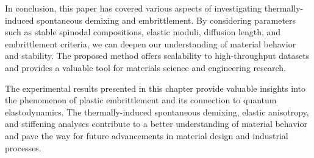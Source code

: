 In conclusion, this paper has covered various aspects of investigating thermally-induced spontaneous demixing and embrittlement. By considering parameters such as stable spinodal compositions, elastic moduli, diffusion length, and embrittlement criteria, we can deepen our understanding of material behavior and stability. The proposed method offers scalability to high-throughput datasets and provides a valuable tool for materials science and engineering research.

The experimental results presented in this chapter provide valuable insights into the phenomenon of plastic embrittlement and its connection to quantum elastodynamics. The thermally-induced spontaneous demixing, elastic anisotropy, and stiffening analyses contribute to a better understanding of material behavior and pave the way for future advancements in material design and industrial processes.